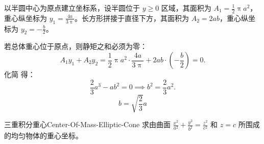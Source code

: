 \begin{solution}
    以半圆中心为原点建立坐标系，设半圆位于 $y \ge 0$ 区域，其面积为 $A_1 = \frac{1}{2} \uppi a^2$，重心纵坐标为 $y_1 = \frac{4a}{3\uppi}$。长方形拼接于直径下方，其面积为 $A_2 = 2ab$，重心纵坐标为 $y_2 = -\frac{b}{2}$。

    \begin{center}
    \end{center}

    若总体重心位于原点，则静矩之和必须为零：
    \begin{equation}\label{eq:center-balance}
        A_1 y_1 + A_2 y_2 = \frac{1}{2} \uppi a^2 \cdot \frac{4a}{3\uppi} + 2ab \cdot \left( -\frac{b}{2} \right) = 0.
    \end{equation}
    化简  得：
    \begin{equation}\label{eq:solve-b}
        \frac{2}{3} a^3 - ab^2 = 0 \implies b^2 = \frac{2}{3} a^2.
    \end{equation}
    \begin{equation}
        \boxed{b = \sqrt{\frac{2}{3}} a}
    \end{equation}
\end{solution}

\begin{problem}{三重积分重心}{Center-Of-Mass-Elliptic-Cone}
    求由曲面 $\frac{x^2}{a^2} + \frac{y^2}{b^2} = \frac{z^2}{c^2}$ 和 $z = c$ 所围成的均匀物体的重心坐标。
\end{problem}

